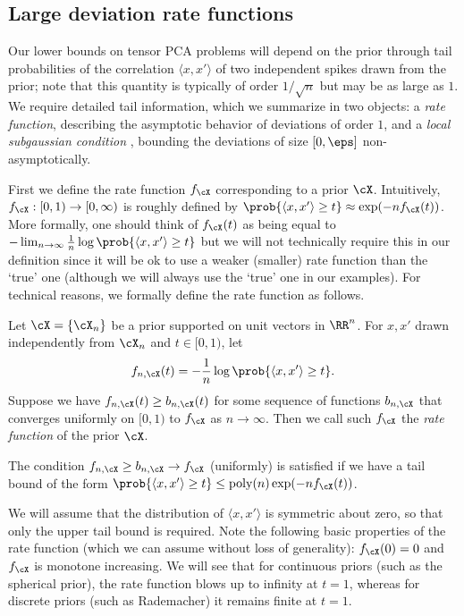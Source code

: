 \documentclass{article}
\begin{document}
\subsection{Large deviation rate functions}

Our lower bounds on tensor PCA problems will depend on the prior through tail probabilities of the correlation $\langle x,x' \rangle$ of two independent spikes drawn from the prior; note that this quantity is typically of order $1/\sqrt{n}$ but may be as large as $1$. We require detailed tail information, which we summarize in two objects: a \emph{rate function}, describing the asymptotic behavior of deviations of order $1$, and a \emph{local subgaussian condition} \cite{chareka2006}, bounding the deviations of size $[0,\eps]$ non-asymptotically.

First we define the rate function $f_\cX$ corresponding to a prior $\cX$. Intuitively, $f_\cX:[0,1) \to [0,\infty)$ is roughly defined by $\prob{\langle x,x' \rangle \geq t} \approx \exp(-n f_\cX(t))$. More formally, one should think of $f_\cX(t)$ as being equal to $- \lim_{n \to \infty} \frac{1}{n} \log \prob{\langle x,x' \rangle \geq t}$ but we will not technically require this in our definition since it will be ok to use a weaker (smaller) rate function than the `true' one (although we will always use the `true' one in our examples). For technical reasons, we formally define the rate function as follows.

\begin{definition}\label{def:rate-function}
Let $\cX = \{\cX_n\}$ be a prior supported on unit vectors in $\RR^n$. For $x,x'$ drawn independently from $\cX_n$ and $t \in [0,1)$, let
$$ f_{n,\cX}(t) = -\frac1n \log \prob{\langle x,x' \rangle \geq t}. $$
Suppose we have $f_{n,\cX}(t) \geq b_{n,\cX}(t)$ for some sequence of functions $b_{n,\cX}$ that converges uniformly on $[0,1)$ to $f_\cX$ as $n \to \infty$. Then we call such $f_{\cX}$ the \emph{rate function} of the prior $\cX$.
\end{definition}

\begin{remark}
\label{rem:tail-unif}
The condition $f_{n,\cX} \ge b_{n,\cX} \to f_\cX$ (uniformly) is satisfied if we have a tail bound of the form $\prob{\langle x,x' \rangle \ge t} \le \mathrm{poly}(n) \exp(-n f_\cX(t))$.
\end{remark}

\noindent We will assume that the distribution of $\langle x,x' \rangle$ is symmetric about zero, so that only the upper tail bound is required. Note the following basic properties of the rate function (which we can assume without loss of generality): $f_\cX(0) = 0$ and $f_\cX$ is monotone increasing. We will see that for continuous priors (such as the spherical prior), the rate function blows up to infinity at $t=1$, whereas for discrete priors (such as Rademacher) it remains finite at $t=1$.
\end{document}
